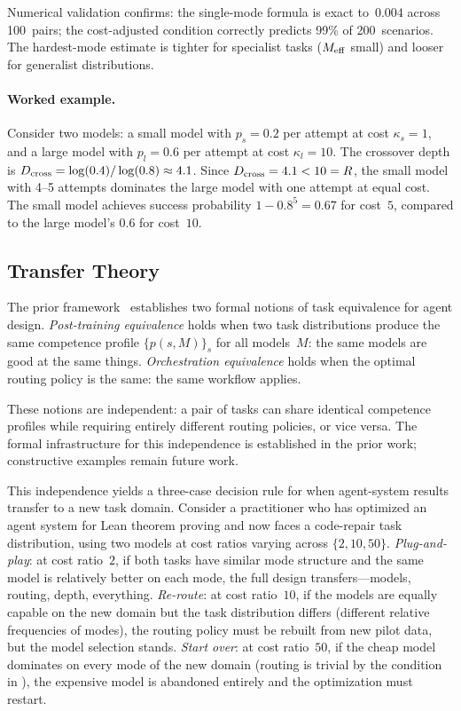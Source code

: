 Numerical validation confirms: the single-mode formula is exact to~$0.004$ across 100~pairs; the cost-adjusted condition correctly predicts 99\% of 200~scenarios.
The hardest-mode estimate is tighter for specialist tasks ($M_{\mathrm{eff}}$ small) and looser for generalist distributions.

\paragraph{Worked example.}
Consider two models: a small model with $p_s = 0.2$ per attempt at cost $\kappa_s = 1$, and a large model with $p_l = 0.6$ per attempt at cost $\kappa_l = 10$.
The crossover depth is $D_{\mathrm{cross}} = \log(0.4)/\log(0.8) \approx 4.1$.
Since $D_{\mathrm{cross}} = 4.1 < 10 = R$, the small model with 4--5 attempts dominates the large model with one attempt at equal cost.
The small model achieves success probability $1 - 0.8^5 = 0.67$ for cost~$5$, compared to the large model's $0.6$ for cost~$10$.

\subsection{Transfer Theory}
\label{sec:transfer}


The prior framework~\citep{beneventano2026framework} establishes two formal notions of task equivalence for agent design.
\emph{Post-training equivalence} holds when two task distributions produce the same competence profile $\{p(s,M)\}_s$ for all models~$M$: the same models are good at the same things.
\emph{Orchestration equivalence} holds when the optimal routing policy is the same: the same workflow applies.

These notions are independent: a pair of tasks can share identical competence profiles while requiring entirely different routing policies, or vice versa.
The formal infrastructure for this independence is established in the prior work; constructive examples remain future work.

This independence yields a three-case decision rule for when agent-system results transfer to a new task domain.
Consider a practitioner who has optimized an agent system for Lean theorem proving and now faces a code-repair task distribution, using two models at cost ratios varying across $\{2, 10, 50\}$.
\emph{Plug-and-play}: at cost ratio~$2$, if both tasks have similar mode structure and the same model is relatively better on each mode, the full design transfers---models, routing, depth, everything.
\emph{Re-route}: at cost ratio~$10$, if the models are equally capable on the new domain but the task distribution differs (different relative frequencies of modes), the routing policy must be rebuilt from new pilot data, but the model selection stands.
\emph{Start over}: at cost ratio~$50$, if the cheap model dominates on every mode of the new domain (routing is trivial by the condition in ), the expensive model is abandoned entirely and the optimization must restart.


